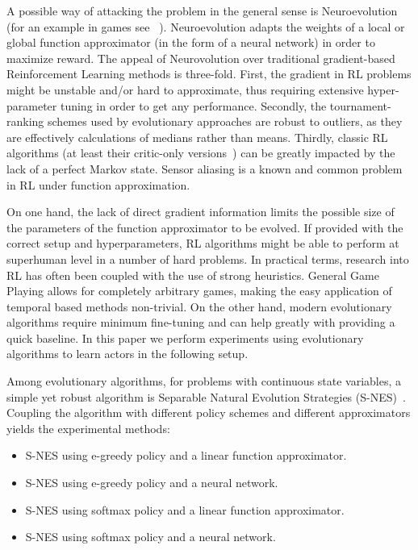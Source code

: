 \documentclass[conference]{IEEEtran}
\newenvironment{mitems}
{\begin{itemize}
\setlength{\itemsep}{1pt}
\setlength{\parskip}{0pt}
\setlength{\parsep}{0pt}}{\end{itemize}}
\begin{document}
A possible way of attacking the problem in the general sense is Neuroevolution (for an example in games see ~\cite{stanley2005real}). Neuroevolution adapts the weights of a local or global function approximator (in the form of a neural network) in order to maximize reward. The appeal of Neurovolution over traditional gradient-based Reinforcement Learning methods is three-fold. First, the gradient in RL problems might be unstable and/or hard to approximate, thus requiring extensive hyper-parameter tuning in order to get any performance. Secondly, the tournament-ranking schemes used by evolutionary approaches are robust to outliers, as they are effectively calculations of medians rather than means. Thirdly, classic RL algorithms (at least their critic-only versions~\cite{singh1994learning}) can be greatly impacted by the lack of a perfect Markov state. Sensor aliasing is a known and common problem in RL under function approximation. 

On one hand, the lack of direct gradient information limits the possible size of the parameters of the function approximator to be evolved. If provided with the correct setup and hyperparameters, RL algorithms might be able to perform at superhuman level in a number of hard problems. In practical terms, research into RL has often been coupled with the use of strong heuristics. General Game Playing allows for completely arbitrary games, making the easy application of temporal based methods non-trivial. On the other hand, modern evolutionary algorithms require minimum fine-tuning and can help greatly with providing a quick baseline. In this paper we perform experiments using evolutionary algorithms to learn actors in the following setup. 

Among evolutionary algorithms, for problems with continuous state variables,  a simple yet robust algorithm is Separable Natural Evolution Strategies (S-NES)~\cite{schaul2011high}. Coupling the algorithm with different policy schemes and different approximators yields the experimental methods: 

\begin{mitems}
\item S-NES using e-greedy policy and a linear function approximator. 
\item S-NES using e-greedy policy and a neural network.
\item S-NES using softmax policy and a linear function approximator.
\item S-NES using softmax policy and a neural network.
\end{mitems}
\end{document}
